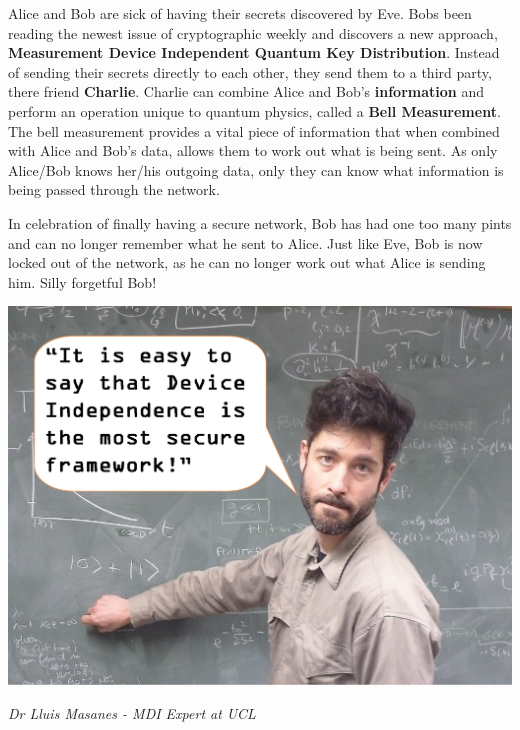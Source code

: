 \documentclass[portrait,final,archA0,fontscale=0.372]{baposter}
\begin{document}
\begin{poster}
{\begin{multicols}{2}

\noindent Alice and Bob are sick of having their secrets discovered by Eve. Bobs been reading the newest issue of cryptographic weekly and discovers a new approach, \textbf{Measurement Device Independent Quantum Key Distribution}. Instead of sending their secrets directly to each other, they send them to a third party, there friend \textbf{Charlie}. Charlie can combine Alice and Bob's \textbf{information} and perform an operation unique to quantum physics, called a \textbf{Bell Measurement}. The bell measurement provides a vital piece of information that when combined with Alice and Bob's data, allows them to work out what is being sent. As only Alice/Bob knows her/his outgoing data, only they can know what information is being passed through the network.

\vspace{0.3cm}

\noindent In celebration of finally having a secure network, Bob has had one too many pints and can no longer remember what he sent to Alice. Just like Eve, Bob is now locked out of the network, as he can no longer work out what Alice is sending him. Silly forgetful Bob!  

\begin{center}
    \includegraphics[width=\linewidth]{img/luis_sp} 
\end{center} 

\centering\textit{Dr Lluis Masanes - MDI Expert at UCL}

\end{multicols}
}



\end{poster}
\end{document}
